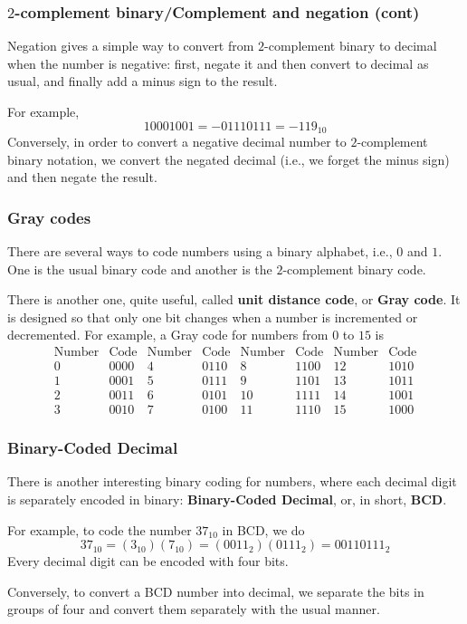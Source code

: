 % 
\begin{frame}
\frametitle{\(2\)-complement binary/Complement and negation (cont)}

Negation gives a simple way to convert from \(2\)-complement binary to
decimal when the number is negative: first, negate it and then convert
to decimal as usual, and finally add a minus sign to the result.

\bigskip

For example,
\[
10001001 = -01110111 = -119_{10}
\]
Conversely, in order to convert a negative decimal number to
\(2\)-complement binary notation, we convert the negated decimal
(i.e., we forget the minus sign) and then negate the result.

\end{frame}

% 
\begin{frame}
\frametitle{Gray codes}

There are several ways to code numbers using a binary alphabet, i.e.,
\(0\) and \(1\). One is the usual binary code and another is the
\(2\)-complement binary code.

\bigskip

There is another one, quite useful, called \textbf{unit distance
  code}, or \textbf{Gray code}. It is designed so that only one bit
changes when a number is incremented or decremented. For example, a
Gray code for numbers from \(0\) to \(15\) is
\[
\begin{array}{rr|rr|rr|rr}
\text{Number} & \text{Code} & \text{Number} & \text{Code} &
\text{Number} & \text{Code} & \text{Number} & \text{Code}\\
\hline
0 & 0000 &  4 & 0110 &  8 & 1100 & 12 & 1010\\
1 & 0001 &  5 & 0111 &  9 & 1101 & 13 & 1011\\
2 & 0011 &  6 & 0101 & 10 & 1111 & 14 & 1001\\
3 & 0010 &  7 & 0100 & 11 & 1110 & 15 & 1000
\end{array}
\]

\end{frame}

% 
\begin{frame}
\frametitle{Binary-Coded Decimal}

There is another interesting binary coding for numbers, where each
decimal digit is separately encoded in binary: \textbf{Binary-Coded
  Decimal}, or, in short, \textbf{BCD}.

\bigskip

For example, to code the number \(37_{10}\) in BCD, we do
\[
37_{10} = (3_{10})(7_{10}) = (0011_2)(0111_2) = 00110111_2
\]
Every decimal digit can be encoded with four bits.

\bigskip

Conversely, to convert a BCD number into decimal, we separate the bits
in groups of four and convert them separately with the usual manner.

\end{frame}

